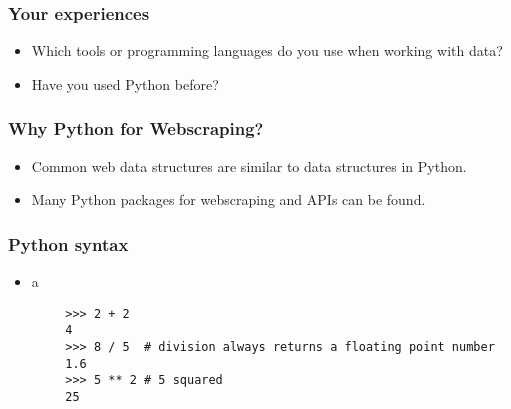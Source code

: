
\begin{frame}
    \frametitle{Your experiences}
    \begin{itemize}
        \item Which tools or programming languages do you use when
        working with data?
        \item Have you used Python before?
    \end{itemize}
\end{frame}

\begin{frame}
    \frametitle{Why Python for Webscraping?}
    \begin{itemize}
        \item<1:> Common web data structures are similar to data
        structures in Python.
        \item<2:> Many Python packages for webscraping and APIs can be
        found.
    \end{itemize}
\end{frame}

\begin{frame}[fragile]
    \frametitle{Python syntax}
    \begin{itemize}
        \item a
    \end{itemize}
\begin{verbatim}
        >>> 2 + 2
        4
        >>> 8 / 5  # division always returns a floating point number
        1.6
        >>> 5 ** 2 # 5 squared
        25
\end{verbatim}
\end{frame}


